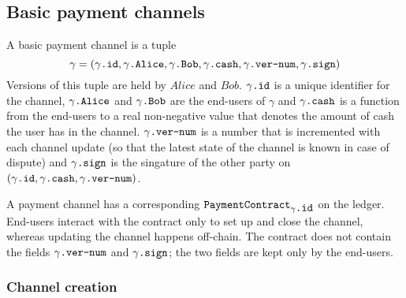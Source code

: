 \subsection{Basic payment channels}
  A basic payment channel is a tuple
  \begin{equation*}
    \gamma = \left(\gamma\mbox{\texttt{.id}}, \gamma\mbox{\texttt{.Alice}},
    \gamma\mbox{\texttt{.Bob}}, \gamma\mbox{\texttt{.cash}},
    \gamma\mbox{\texttt{.ver-num}}, \gamma\mbox{\texttt{.sign}}\right)
  \end{equation*}
  Versions of this tuple are held by $Alice$ and $Bob$. $\gamma\mbox{\texttt{.id}}$ is a
  unique identifier for the channel, $\gamma\mbox{\texttt{.Alice}}$ and
  $\gamma\mbox{\texttt{.Bob}}$ are the end-users of $\gamma$ and
  $\gamma\mbox{\texttt{.cash}}$ is a function from the end-users to a real non-negative
  value that denotes the amount of cash the user has in the channel.
  $\gamma\mbox{\texttt{.ver-num}}$ is a number that is incremented with each channel
  update (so that the latest state of the channel is known in case of dispute) and
  $\gamma\mbox{\texttt{.sign}}$ is the singature of the other party on
  $\left(\gamma\mbox{\texttt{.id}}, \gamma\mbox{\texttt{.cash}},
  \gamma\mbox{\texttt{.ver-num}}\right)$.

  A payment channel has a corresponding
  $\mbox{\texttt{PaymentContract}}_{\gamma\mbox{\texttt{.id}}}$ on the ledger. End-users
  interact with the contract only to set up and close the channel, whereas updating the
  channel happens off-chain. The contract does not contain the fields
  $\gamma\mbox{\texttt{.ver-num}}$ and $\gamma\mbox{\texttt{.sign}}$; the two fields are
  kept only by the end-users.

  \subsubsection{Channel creation} \ \\

